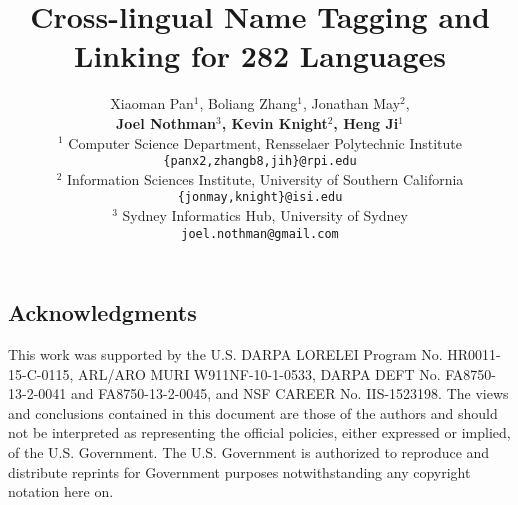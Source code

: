 \documentclass[11pt,a4paper]{article}
\title{Cross-lingual Name Tagging and Linking for 282 Languages}
\author{Xiaoman Pan$^{1}$, Boliang Zhang$^{1}$, Jonathan May$^{2}$,\\
\textbf{Joel Nothman$^{3}$, Kevin Knight$^{2}$, Heng Ji$^{1}$}\\
$^{1}$ Computer Science Department, Rensselaer Polytechnic Institute\\
        {\tt \{panx2,zhangb8,jih\}@rpi.edu}\\
$^{2}$ Information Sciences Institute, University of Southern California\\
        {\tt \{jonmay,knight\}@isi.edu}\\
$^{3}$ Sydney Informatics Hub, University of Sydney\\
       {\tt joel.nothman@gmail.com}\\
}
\newcommand{\todo}[1]{\textsf{\textbf{\textcolor{red}{[[#1]]}}}}
\begin{document}
\begin{CJK*}{UTF8}{gbsn}
\maketitle

 







\section*{Acknowledgments}
This work was supported by the U.S. DARPA LORELEI Program No. HR0011-15-C-0115, ARL/ARO MURI W911NF-10-1-0533, DARPA DEFT  No. FA8750-13-2-0041 and FA8750-13-2-0045, and NSF CAREER No. IIS-1523198. The views and conclusions contained in this document are those of the authors and should not be interpreted as  representing the official policies, either expressed or implied, of the U.S. Government. The U.S. Government is authorized to reproduce  and distribute reprints for Government purposes notwithstanding any copyright notation here on.






\clearpage\end{CJK*}
\end{document}
